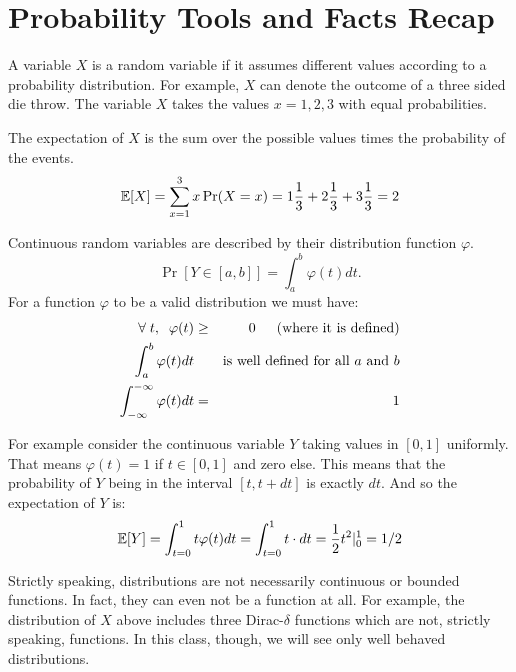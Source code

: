\documentclass{article}
\begin{document}
\section{Probability Tools and Facts Recap}

A variable $X$ is a random variable if it assumes different values
according to a probability distribution. For example, $X$ can 
denote the outcome of a three sided die throw. 
The variable $X$ takes the values $x = 1,2,3$ with equal probabilities. 

The expectation of $X$ is the sum over the possible values times the probability of the events.
\begin{equation}
{\mathbb E}[X] = \sum_{x=1}^{3}x \Pr(X = x)=
1\frac{1}{3}+2\frac{1}{3}+3\frac{1}{3} = 2
\end{equation}


Continuous random variables are described by their distribution function $\varphi$.
$$
\Pr[Y \in [a,b]] = \int_{a}^{b}\varphi (t) dt.
$$
For a function $\varphi$ to be a valid distribution we must have:
\begin{eqnarray}
\forall \;t, \;\; \varphi(t) &\ge& 0  \mbox{\;\;\; (where it is defined)}\\
\int_{a}^{b}\varphi (t) dt && \mbox{is well defined for all $a$ and $b$}\\
\int_{-\infty}^{-\infty}\varphi (t) dt &=& 1
\end{eqnarray}

For example consider the continuous variable $Y$ taking values in
$[0,1]$ uniformly. That means $\varphi(t) = 1$ if $t \in [0,1]$ and zero else.
This means that the probability of $Y$ being in the interval $[t,t + dt]$ is exactly $dt$. And so the expectation of $Y$ is:
\begin{equation}
{\mathbb E}[Y] = \int_{t=0}^{1}t \varphi(t) dt = \int_{t=0}^{1}t \cdot dt = \frac{1}{2}t^2|_{0}^{1} = 1/2
\end{equation}

\begin{remark}
Strictly speaking, distributions are not necessarily continuous or bounded functions. 
In fact, they can even not be a function at all. 
For example, the distribution of $X$ above includes three Dirac-$\delta$ functions which are not, strictly speaking, functions.
In this class, though, we will see only well behaved distributions.
\end{remark}
\end{document}
